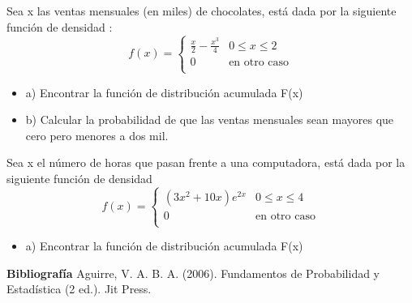 \documentclass{../oxmathproblems}
\begin{document}
\begin{questions}
\miquestion Sea x las ventas mensuales (en miles) de chocolates, está dada por la siguiente función de densidad : 
\[ 
f(x) = 
     \begin{cases}
       \frac{x}{2} - \frac{x^3}{4}  & 0  \leq x  \leq 2 \\
       0 & \text{en otro caso} \\
     \end{cases}
\]
$$$$
\begin{itemize}
\item  a) Encontrar la función de distribución acumulada  F(x)   
\item  b) Calcular la probabilidad de que las ventas mensuales sean mayores que cero pero menores a dos mil.  
\end{itemize}

\miquestion Sea x el número de horas que pasan frente a una computadora, está dada por la siguiente función de densidad 
\[ 
f(x) = 
     \begin{cases}
        (3x^2 + 10x)e^{2x}  & 0  \leq x  \leq 4 \\
       0 & \text{en otro caso} \\
     \end{cases}
\]
$$$$
\begin{itemize}
\item  a) Encontrar la función de distribución acumulada  F(x)  
\end{itemize}



\end{questions}



\textbf{Bibliografía}
Aguirre, V. A. B. A. (2006). Fundamentos de Probabilidad y Estadística (2 ed.). Jit Press.
\end{document}

